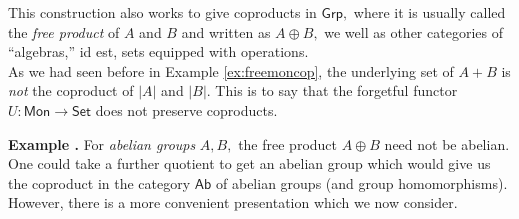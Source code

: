 \documentclass[11pt,leqno,landscape,semhelv]{seminar}
\theoremstyle{definition}
\numberwithin{joke}{section}
\numberwithin{thm}{section}
\numberwithin{equation}{section}
\newcommand{\example}[1]{\refstepcounter{thm}\par\medskip
   {\textbf{Example \thethm.} #1} \rmfamily}
\begin{document}
This construction also works to give coproducts in $\mathsf{Grp},$ where it is usually called the \emph{free product} of $A$ and $B$ and written as $A \oplus B,$ we well as other categories of ``algebras,'' id est, sets equipped with operations. \\
As we had seen before in Example \ref{ex:freemoncop}, the underlying set of $A+B$ is \emph{not} the coproduct of $|A|$ and $|B|.$ This is to say that the forgetful functor $U:\mathsf{Mon} \to \mathsf{Set}$ does not preserve coproducts.

\example{} For \emph{abelian groups} $A, B,$ the free product $A \oplus B$ need not be abelian. One could take a further quotient to get an abelian group which would give us the coproduct in the category $\mathsf{Ab}$ of abelian groups (and group homomorphisms). However, there is a more convenient presentation which we now consider.
\end{document}

